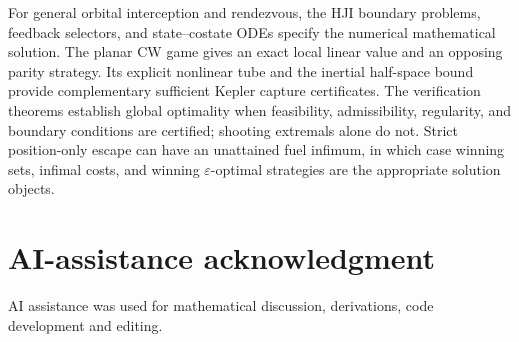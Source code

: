 \documentclass[journal,a4paper]{IEEEtran}
\begin{document}
For general orbital interception and rendezvous, the HJI boundary problems, feedback selectors, and state--costate ODEs specify the numerical mathematical solution. The planar CW game gives an exact local linear value and an opposing parity strategy. Its explicit nonlinear tube and the inertial half-space bound provide complementary sufficient Kepler capture certificates. The verification theorems establish global optimality when feasibility, admissibility, regularity, and boundary conditions are certified; shooting extremals alone do not. Strict position-only escape can have an unattained fuel infimum, in which case winning sets, infimal costs, and winning $\varepsilon$-optimal strategies are the appropriate solution objects.

\section*{AI-assistance acknowledgment}
AI assistance was used for mathematical discussion, derivations, code development and editing.


{\footnotesize}
\end{document}
